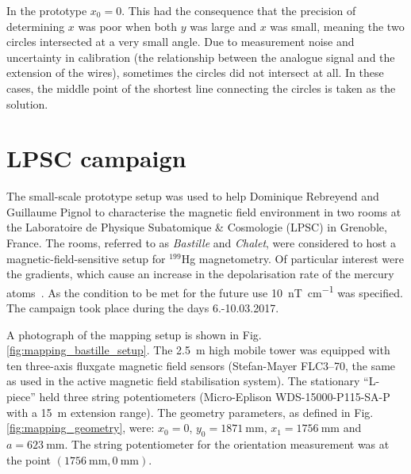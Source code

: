 In the prototype $x_0 = 0$.
This had the consequence that the precision of determining $x$ was poor when both $y$ was large and $x$ was small,
meaning the two circles intersected at a very small angle.
Due to measurement noise and uncertainty in calibration (the relationship between the analogue signal and the extension of the wires), sometimes the circles did not intersect at all.
In these cases, the middle point of the shortest line connecting the circles is taken as the solution.




\section{LPSC campaign}
\label{sec:lpsc_campaign}
The small-scale prototype setup was used to help Dominique Rebreyend and Guillaume Pignol to characterise the magnetic field environment in two rooms at the Laboratoire de Physique Subatomique \& Cosmologie (LPSC) in Grenoble, France.
The rooms, referred to as \emph{Bastille} and \emph{Chalet}, were considered to host a magnetic-field-sensitive setup for ${}^{199}$Hg magnetometry.
Of particular interest were the gradients, which cause an increase in the depolarisation rate of the mercury atoms~\cite{FertlThesis}.
As the condition to be met for the future use \SI[per-mode=symbol]{10}{\nano\tesla\per\centi\metre} was specified.
The campaign took place during the days 6.-10.03.2017.

A photograph of the mapping setup is shown in Fig.\,\ref{fig:mapping_bastille_setup}.
The \SI{2.5}{\metre} high mobile tower was equipped with ten three-axis fluxgate magnetic field sensors (Stefan-Mayer FLC3--70, the same as used in the active magnetic field stabilisation system).
The stationary ``L-piece'' held three string potentiometers (Micro-Eplison WDS-15000-P115-SA-P with a \SI{15}{\metre} extension range).
The geometry parameters, as defined in Fig.\,\ref{fig:mapping_geometry}, were: $x_0 = 0$, $y_0 = \SI{1871}{\milli\metre}$, $x_1 = \SI{1756}{\milli\metre}$ and $a = \SI{623}{\milli\metre}$.
The string potentiometer for the orientation measurement was at the point $(\SI{1756}{\milli\metre}, \SI{0}{\milli\metre})$.



